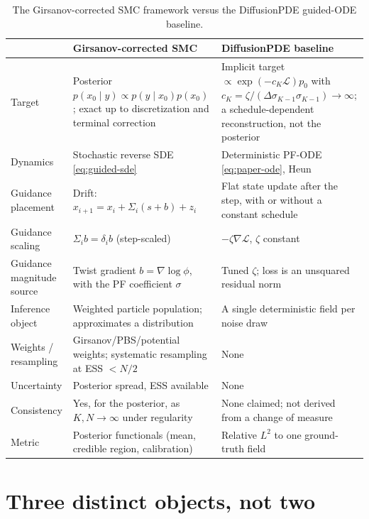 \documentclass[11pt]{article}
\begin{document}
\begin{table}[ht]
\centering
\small
\caption{The Girsanov-corrected SMC framework versus the DiffusionPDE guided-ODE baseline.}
\label{tab:compare}
\begin{tabularx}{\textwidth}{@{}l>{\raggedright\arraybackslash}X>{\raggedright\arraybackslash}X@{}}
\toprule
 & \textbf{Girsanov-corrected SMC} \citep{note1} & \textbf{DiffusionPDE baseline} \citep{huang2024diffusionpde} \\
\midrule
Target & Posterior $p(x_0\mid y)\propto p(y\mid x_0)p(x_0)$; exact up to discretization and terminal correction & Implicit target $\propto\exp(-c_K\mathcal L)p_0$ with $c_K=\zeta/(\Delta\sigma_{K-1}\sigma_{K-1})\to\infty$; a schedule-dependent reconstruction, not the posterior \\
Dynamics & Stochastic reverse SDE \eqref{eq:guided-sde} & Deterministic PF-ODE \eqref{eq:paper-ode}, Heun \\
Guidance placement & Drift: $x_{i+1}=x_i+\Sigma_i(s+b)+z_i$ & Flat state update after the step, with or without a constant schedule \\
Guidance scaling & $\Sigma_i b=\delta_i b$ (step-scaled) & $-\zeta\nabla\mathcal L$, $\zeta$ constant \\
Guidance magnitude source & Twist gradient $b=\nabla\log\phi$, with the PF coefficient $\sigma$ & Tuned $\zeta$; loss is an unsquared residual norm \\
Inference object & Weighted particle population; approximates a distribution & A single deterministic field per noise draw \\
Weights / resampling & Girsanov/PBS/potential weights; systematic resampling at ESS $<N/2$ & None \\
Uncertainty & Posterior spread, ESS available & None \\
Consistency & Yes, for the posterior, as $K,N\to\infty$ under regularity & None claimed; not derived from a change of measure \\
Metric & Posterior functionals (mean, credible region, calibration) & Relative $L^2$ to one ground-truth field \\
\bottomrule
\end{tabularx}
\end{table}

\section{Three distinct objects, not two}\label{sec:three}
\end{document}
